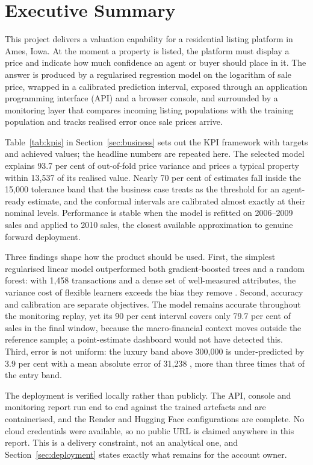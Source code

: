 \section{Executive Summary}

This project delivers a valuation capability for a residential listing platform in
Ames, Iowa. At the moment a property is listed, the platform must display a price
and indicate how much confidence an agent or buyer should place in it. The answer is
produced by a regularised regression model on the logarithm of sale price, wrapped in
a calibrated prediction interval, exposed through an application programming
interface (API) and a browser console, and surrounded by a monitoring layer that
compares incoming listing populations with the training population and tracks
realised error once sale prices arrive.



Table~\ref{tab:kpis} in Section~\ref{sec:business} sets out the KPI framework with
targets and achieved values; the headline numbers are repeated here. The selected
model explains 93.7 per cent of out-of-fold price variance and prices a
typical property within 13,537 \USD{} of its realised value. Nearly 70 per cent of
estimates fall inside the 15,000 \USD{} tolerance band that the business case treats
as the threshold for an agent-ready estimate, and the conformal intervals are
calibrated almost exactly at their nominal levels. Performance is stable when the
model is refitted on 2006--2009 sales and applied to 2010 sales, the closest
available approximation to genuine forward deployment.

Three findings shape how the product should be used. First, the simplest regularised
linear model outperformed both gradient-boosted trees and a random forest: with 1,458
transactions and a dense set of well-measured attributes, the variance cost of
flexible learners exceeds the bias they remove \citep{hastie2009esl}. Second,
accuracy and calibration are separate objectives. The model remains accurate
throughout the monitoring replay, yet its 90 per cent interval covers only 79.7 per
cent of sales in the final window, because the macro-financial context moves outside
the reference sample; a point-estimate dashboard would not have detected this.
Third, error is not uniform: the luxury band above 300,000 \USD{} is under-predicted
by 3.9 per cent with a mean absolute error of 31,238 \USD, more than three times that
of the entry band.

The deployment is verified locally rather than publicly. The API, console and
monitoring report run end to end against the trained artefacts and are containerised,
and the Render and Hugging Face configurations are complete. No cloud credentials
were available, so no public URL is claimed anywhere in this report. This is a
delivery constraint, not an analytical one, and Section~\ref{sec:deployment} states
exactly what remains for the account owner.
